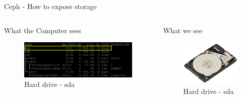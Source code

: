 \begin{frame}{Ceph - How to expose storage}
\begin{columns}
    \begin{column}{0.47\textwidth}
    \begin{block}{What the Computer sees}
    \begin{figure}
        \centering
        \includegraphics[width=\textwidth,height=0.55\textheight,keepaspectratio]{img/linuxdisk.PNG}
        \caption{Hard drive - sda}
        \label{fig:my_label}
    \end{figure}
    \end{block}
    \end{column}
    \begin{column}{0.47\textwidth}
    \begin{block}{What we see}
    \begin{figure}
        \centering
        \includegraphics[width=\textwidth,height=0.55\textheight,keepaspectratio]{img/harddrive.jpg}
        \caption{Hard drive - sda}
        \label{fig:my_label}
    \end{figure}
    \end{block}
    \end{column}
\end{columns}
\end{frame}

